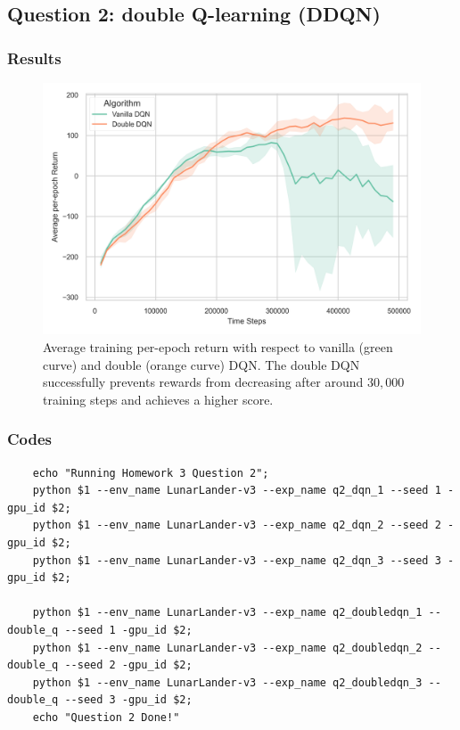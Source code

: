 \documentclass[10pt, letterpaper]{article}
\begin{document}
\pagebreak
\subsection*{Question 2: double Q-learning (DDQN)}
\subsubsection*{Results}
\begin{figure}[thbp]
    \centering 
    \includegraphics[width=\textwidth]{./img/q2.png}
    \caption{Average training per-epoch return with respect to vanilla (green curve) and double (orange curve) DQN. The double DQN successfully prevents rewards from decreasing after around $30,000$ training steps and achieves a higher score.}
    \label{fig:2}
\end{figure}
\subsubsection*{Codes}
\begin{lstlisting}
    echo "Running Homework 3 Question 2";
    python $1 --env_name LunarLander-v3 --exp_name q2_dqn_1 --seed 1 -gpu_id $2;
    python $1 --env_name LunarLander-v3 --exp_name q2_dqn_2 --seed 2 -gpu_id $2;
    python $1 --env_name LunarLander-v3 --exp_name q2_dqn_3 --seed 3 -gpu_id $2;

    python $1 --env_name LunarLander-v3 --exp_name q2_doubledqn_1 --double_q --seed 1 -gpu_id $2;
    python $1 --env_name LunarLander-v3 --exp_name q2_doubledqn_2 --double_q --seed 2 -gpu_id $2;
    python $1 --env_name LunarLander-v3 --exp_name q2_doubledqn_3 --double_q --seed 3 -gpu_id $2;
    echo "Question 2 Done!"
\end{lstlisting}
\end{document}
